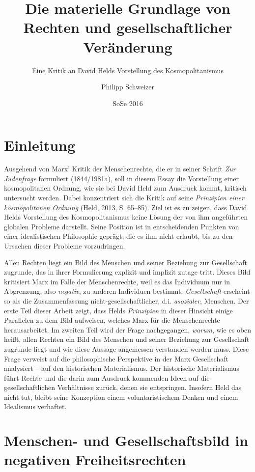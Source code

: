 \documentclass[ngerman,12pt, titlepage, smallheadings, nomath]{scrartcl}
\title{Die materielle Grundlage von Rechten und gesellschaftlicher Veränderung}
\subtitle{Eine Kritik an David Helds Vorstellung des Kosmopolitanismus}
\author{Philipp Schweizer}
\date{SoSe 2016}
\begin{document}
\maketitle

{
\setcounter{tocdepth}{3}
\tableofcontents
}
\newpage

\section{Einleitung}\label{einleitung}

Ausgehend von Marx' Kritik der Menschenrechte, die er in seiner Schrift
\emph{Zur Judenfrage} formuliert (1844/1981a), soll in diesem Essay die
Vorstellung einer kosmopolitanen Ordnung, wie sie bei David Held zum
Ausdruck kommt, kritisch untersucht werden. Dabei konzentriert sich die
Kritik auf seine \emph{Prinzipien einer kosmopolitanen Ordnung} (Held,
2013, S. 65--85). Ziel ist es zu zeigen, dass David Helds Vorstellung
des Kosmopolitanismus keine Lösung der von ihm angeführten globalen
Probleme darstellt. Seine Position ist in entscheidenden Punkten von
einer idealistischen Philosophie geprägt, die es ihm nicht erlaubt, bis
zu den Ursachen dieser Probleme vorzudringen.

Allen Rechten liegt ein Bild des Menschen und seiner Beziehung zur
Gesellschaft zugrunde, das in ihrer Formulierung explizit und implizit
zutage tritt. Dieses Bild kritisiert Marx im Falle der Menschenrechte,
weil es das Individuum nur in Abgrenzung, also \emph{negativ}, zu
anderen Individuen bestimmt. \emph{Gesellschaft} erscheint so als die
Zusammenfassung nicht-gesellschaftlicher, d.i. \emph{asozialer},
Menschen. Der erste Teil dieser Arbeit zeigt, dass Helds
\emph{Prinzipien} in dieser Hinsicht einige Parallelen zu dem Bild
aufweisen, welches Marx für die Menschenrechte herausarbeitet. Im
zweiten Teil wird der Frage nachgegangen, \emph{warum}, wie es oben
heißt, allen Rechten ein Bild des Menschen und seiner Beziehung zur
Gesellschaft zugrunde liegt und wie diese Aussage angemessen verstanden
werden muss. Diese Frage verweist auf die philosophische Perspektive in
der Marx Gesellschaft analysiert -- auf den historischen Materialismus.
Der historische Materialismus führt Rechte und die darin zum Ausdruck
kommenden Ideen auf die gesellschaftlichen Verhältnisse zurück, denen
sie entspringen. Insofern Held das nicht tut, bleibt seine Konzeption
einem voluntaristischem Denken und einem Idealismus verhaftet.

\section{Menschen- und Gesellschaftsbild in negativen
Freiheitsrechten}\label{menschen--und-gesellschaftsbild-in-negativen-freiheitsrechten}
\end{document}
